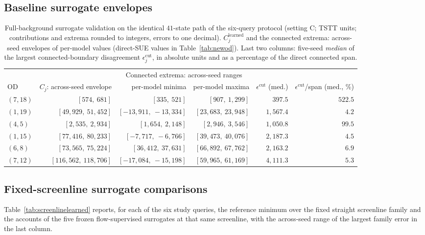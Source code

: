 \subsection{Baseline surrogate envelopes}\label{supp:baselineenvelopes}
\begin{table}[pos=htbp]
\footnotesize
\caption{Full-background surrogate validation on the identical
$41$-state path of the six-query protocol (setting C; TSTT units;
contributions and extrema rounded to integers, errors to one
decimal). $C_j^{\mathrm{learned}}$ and the connected extrema:
across-seed envelopes of per-model values (direct-SUE values in
Table~\ref{tab:newod}). Last two columns: five-seed
\emph{median} of the largest connected-boundary disagreement
$\epsilon_j^{\mathrm{cut}}$, in absolute units and as a percentage of
the direct connected span.}
\label{tab:fullbgsurrogate}
\footnotesize
\begin{tabular*}{\tblwidth}{@{\extracolsep{\fill}}lrrrrr}
\toprule
& & \multicolumn{2}{c}{Connected extrema: across-seed ranges}\\
\cmidrule(lr){3-4}
OD & $C_j$: across-seed envelope & per-model minima & per-model maxima & $\epsilon^{\mathrm{cut}}$ (med.) & $\epsilon^{\mathrm{cut}}$/span (med., \%)\\
\midrule
$(7,18)$ & $[574,\ 681]$ & $[335,\ 521]$ & $[907,\ 1{,}299]$ & $397.5$ & $522.5$ \\
$(1,19)$ & $[49{,}929,\ 51{,}452]$ & $[-13{,}911,\ -13{,}334]$ & $[23{,}683,\ 23{,}948]$ & $1{,}567.4$ & $4.2$ \\
$(4,5)$ & $[2{,}535,\ 2{,}934]$ & $[1{,}654,\ 2{,}148]$ & $[2{,}946,\ 3{,}546]$ & $1{,}050.8$ & $99.5$ \\
$(1,15)$ & $[77{,}416,\ 80{,}233]$ & $[-7{,}717,\ -6{,}766]$ & $[39{,}473,\ 40{,}076]$ & $2{,}187.3$ & $4.5$ \\
$(6,8)$ & $[73{,}565,\ 75{,}224]$ & $[36{,}412,\ 37{,}631]$ & $[66{,}892,\ 67{,}762]$ & $2{,}163.2$ & $6.9$ \\
$(7,12)$ & $[116{,}562,\ 118{,}706]$ & $[-17{,}084,\ -15{,}198]$ & $[59{,}965,\ 61{,}169]$ & $4{,}111.3$ & $5.3$ \\
\bottomrule
\end{tabular*}
\end{table}



\subsection{Fixed-screenline surrogate comparisons}\label{supp:screenlinelearned}
Table~\ref{tab:screenlinelearned} reports, for each of the six study
queries, the reference minimum over the fixed straight screenline
family and the accounts of the five frozen flow-supervised surrogates
at that same screenline, with the across-seed range of the largest
family error in the last column.


